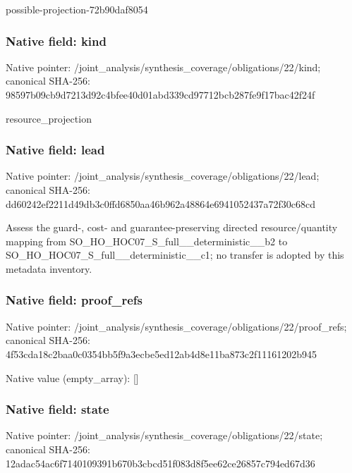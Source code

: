 \documentclass[10pt,a4paper]{article}
\begin{document}
\begingroup\raggedright\sloppy possible-projection-72b90daf8054\par\endgroup

\subsubsection{Native field: kind}
Native pointer: /joint\_\allowbreak{}analysis/synthesis\_\allowbreak{}coverage/obligations/22/kind; canonical SHA-256: 98597b09cb9d7213d92c4bfee40d01abd339cd97712bcb287fe9f17bac42f24f

\begingroup\raggedright\sloppy resource\_\allowbreak{}projection\par\endgroup

\subsubsection{Native field: lead}
Native pointer: /joint\_\allowbreak{}analysis/synthesis\_\allowbreak{}coverage/obligations/22/lead; canonical SHA-256: dd60242ef2211d49db3c0ffd6850aa46b962a48864e6941052437a72f30c68cd

\begingroup\raggedright\sloppy Assess the guard-,\allowbreak{} cost- and guarantee-preserving directed resource/\allowbreak{}quantity mapping from SO\_\allowbreak{}HO\_\allowbreak{}HOC07\_\allowbreak{}S\_\allowbreak{}full\_\allowbreak{}\_\allowbreak{}deterministic\_\allowbreak{}\_\allowbreak{}b2 to SO\_\allowbreak{}HO\_\allowbreak{}HOC07\_\allowbreak{}S\_\allowbreak{}full\_\allowbreak{}\_\allowbreak{}deterministic\_\allowbreak{}\_\allowbreak{}c1;\allowbreak{} no transfer is adopted by this metadata inventory.\par\endgroup

\subsubsection{Native field: proof\_\allowbreak{}refs}
Native pointer: /joint\_\allowbreak{}analysis/synthesis\_\allowbreak{}coverage/obligations/22/proof\_\allowbreak{}refs; canonical SHA-256: 4f53cda18c2baa0c0354bb5f9a3ecbe5ed12ab4d8e11ba873c2f11161202b945

Native value (empty\_\allowbreak{}array): []

\subsubsection{Native field: state}
Native pointer: /joint\_\allowbreak{}analysis/synthesis\_\allowbreak{}coverage/obligations/22/state; canonical SHA-256: 12adac54ac6f7140109391b670b3cbcd51f083d8f5ee62ce26857c794ed67d36
\end{document}
